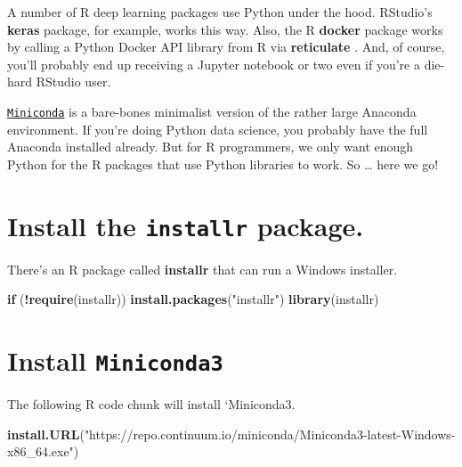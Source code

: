 \documentclass[]{book}
\newenvironment{Shaded}{\begin{snugshade}}{\end{snugshade}}
\newcommand{\ControlFlowTok}[1]{\textcolor[rgb]{0.13,0.29,0.53}{\textbf{#1}}}
\newcommand{\KeywordTok}[1]{\textcolor[rgb]{0.13,0.29,0.53}{\textbf{#1}}}
\newcommand{\NormalTok}[1]{#1}
\newcommand{\OperatorTok}[1]{\textcolor[rgb]{0.81,0.36,0.00}{\textbf{#1}}}
\newcommand{\StringTok}[1]{\textcolor[rgb]{0.31,0.60,0.02}{#1}}
\theoremstyle{definition}
\theoremstyle{definition}
\theoremstyle{definition}
\theoremstyle{remark}
\begin{document}
A number of R deep learning packages use Python under the hood.
RStudio's \textbf{keras} \citep{R-keras} package, for example, works
this way. Also, the R \textbf{docker} \citep{R-docker} package works by
calling a Python Docker API library from R via \textbf{reticulate}
\citep{R-reticulate}. And, of course, you'll probably end up receiving a
Jupyter notebook or two even if you're a die-hard RStudio user.

\href{https://conda.io/miniconda.html}{\texttt{Miniconda}} is a
bare-bones minimalist version of the rather large Anaconda environment.
If you're doing Python data science, you probably have the full Anaconda
installed already. But for R programmers, we only want enough Python for
the R packages that use Python libraries to work. So \ldots{} here we
go!

\hypertarget{install-the-installr-package.}{%
\section{\texorpdfstring{Install the \texttt{installr}
package.}{Install the installr package.}}\label{install-the-installr-package.}}

There's an R package called \textbf{installr} \citep{R-installr} that
can run a Windows installer.

\begin{Shaded}
\begin{Highlighting}[]
\ControlFlowTok{if}\NormalTok{ (}\OperatorTok{!}\KeywordTok{require}\NormalTok{(installr)) }\KeywordTok{install.packages}\NormalTok{(}\StringTok{"installr"}\NormalTok{)}
\KeywordTok{library}\NormalTok{(installr)}
\end{Highlighting}
\end{Shaded}

\hypertarget{install-miniconda3}{%
\section{\texorpdfstring{Install
\texttt{Miniconda3}}{Install Miniconda3}}\label{install-miniconda3}}

The following R code chunk will install `Miniconda3.

\begin{Shaded}
\begin{Highlighting}[]
\KeywordTok{install.URL}\NormalTok{(}\StringTok{"https://repo.continuum.io/miniconda/Miniconda3-latest-Windows-x86_64.exe"}\NormalTok{)}
\end{Highlighting}
\end{Shaded}
\end{document}
